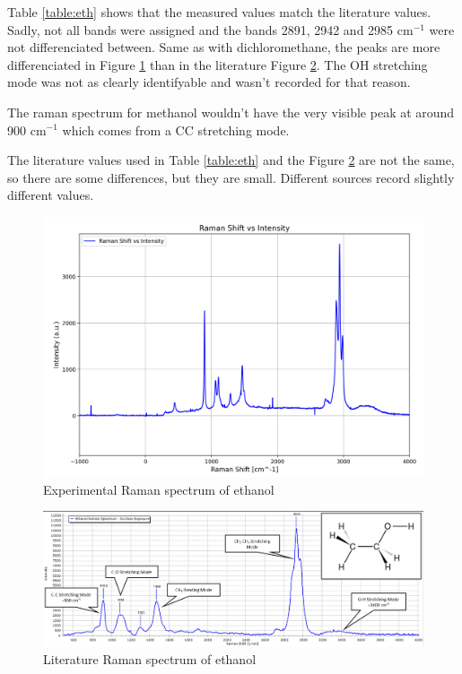     Table \ref{table:eth} shows that the measured values match the literature values. Sadly, not all bands were assigned and the bands 2891, 2942 and 2985 cm\(^{-1}\) were not differenciated between. Same as with dichloromethane, the peaks are more differenciated in Figure \ref{fig:eth_x} than in the literature Figure \ref{fig:eth_l}. The OH stretching mode was not as clearly identifyable and wasn't recorded for that reason.

    \bigskip
    
    The raman spectrum for methanol wouldn't have the very visible peak at around 900 cm\(^{-1}\) which comes from a CC stretching mode.

    The literature values used in Table \ref{table:eth} and the Figure \ref{fig:eth_l} are not the same, so there are some differences, but they are small. Different sources record slightly different values. 

    

    \newpage

    \begin{figure}[h]
        \includegraphics[width=\textwidth]{images/raman_spectra/raman_shift_ethanol.png}
        \caption{Experimental Raman spectrum of ethanol}
        \label{fig:eth_x}
        \vspace{10pt}
    \end{figure}


    \begin{figure}[h]
        \centering
        \includegraphics[width=\textwidth]{images/lit_raman/ethanol.png}
        \caption{Literature Raman spectrum of ethanol \cite{spectrumet} }
        \label{fig:eth_l}
    \end{figure}

